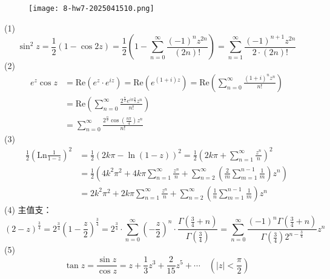 \begin{exercise}
\begin{figure}[H]
\centering
\texttt{[image: 8-hw7-2025041510.png]}
\label{}
\end{figure}
\end{exercise}
(1)
\[
\sin ^2z=\frac{1}{2}(1-\cos2z)=\frac{1}{2}\left( 1-\sum_{n=0}^{\infty} \frac{(-1)^{n}z^{2n}}{(2n)!} \right)=\sum_{n=1}^{\infty} \frac{(-1)^{n+1}z^{2n}}{2\cdot(2n)!}
\]
(2)
\[
\begin{aligned}
e^{ z }\cos z & =\mathrm{Re}(e^{ z }\cdot e^{ iz })=\mathrm{Re}(e^{ (1+i)z })=\mathrm{Re}\left( \sum_{n=0}^{\infty} \frac{(1+i)^{n}z^{n}}{n!} \right) \\
 & =\mathrm{Re}\left( \sum_{n=0}^{\infty} \frac{2^{\frac{n}{2}}e^{ i\pi \frac{n}{4} }z^{n}}{n!}  \right) \\
 & =\sum_{n=0}^{\infty} \frac{2^{\frac{n}{2}}\cos\left( \frac{n\pi}{4} \right)z^{n}}{n!}
\end{aligned}
\]
(3)
\[
\begin{aligned}
\frac{1}{2}\left( \mathrm{Ln}\frac{1}{1-z} \right)^{2} & =\frac{1}{2}(2k\pi-\ln(1-z))^2=\frac{1}{2}\left( 2k\pi+\sum_{n=1}^{\infty} \frac{z^{n}}{n} \right)^2 \\
 & =\frac{1}{2}\left( 4k^2\pi^{2}+4k\pi \sum_{n=1}^{\infty} \frac{z^{n}}{n}+\sum_{n=2}^{\infty} \left( \frac{2}{m} \sum_{m=1}^{n-1} \frac{1}{m} \right)z^{n} \right) \\
 & =2k^2\pi^{2}+2k\pi \sum_{n=1}^{\infty} \frac{z^{n}}{n}+\sum_{n=2}^{\infty} \left( \frac{1}{n} \sum_{m=1}^{n-1} \frac{1}{m} \right)z^{n}
\end{aligned} 
\]
(4) 主值支：
\[
(2-z)^{\frac{3}{4}}=2^{\frac{3}{4}}\left( 1-\frac{z}{2} \right)^{\frac{3}{4}}=2^{\frac{3}{4}}\cdot \sum_{n=0}^{\infty} \left( -\frac{z}{2} \right)^{n}\cdot\frac{\Gamma\left( \frac{3}{4}+n \right)}{\Gamma\left( \frac{3}{4} \right)}=\sum_{n=0}^{\infty} \frac{(-1)^{n}\Gamma\left( \frac{3}{4}+n \right)}{\Gamma\left( \frac{3}{4} \right)2^{n-\frac{3}{4}}}z^{n}
\]
(5)
\[
\tan z=\frac{\sin z}{\cos z}=z+\frac{1}{3} z^3+\frac{2}{15} z^5+\cdots \quad\left(|z|<\frac{\pi}{2}\right)
\]